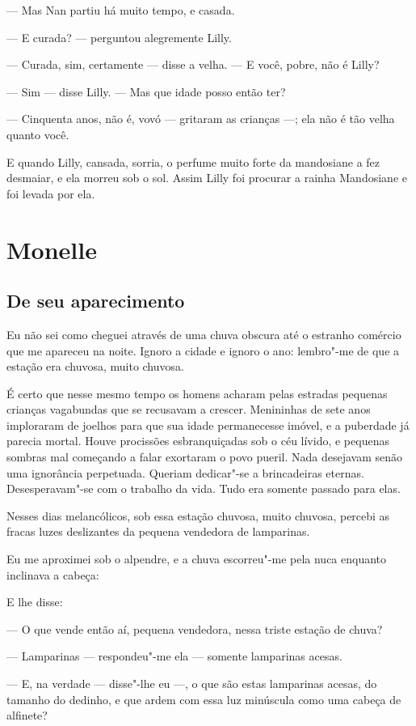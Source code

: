 --- Mas Nan partiu há muito tempo, e casada.

--- E curada? --- perguntou alegremente Lilly.

--- Curada, sim, certamente --- disse a velha. --- E você, pobre, não é Lilly?

--- Sim --- disse Lilly. --- Mas que idade posso então ter?

--- Cinquenta anos, não é, vovó --- gritaram as crianças ---; ela não é tão
velha quanto você.

E quando Lilly, cansada, sorria, o perfume muito forte da mandosiane a
fez desmaiar, e ela morreu sob o sol. Assim Lilly foi procurar a rainha
Mandosiane e foi levada por ela.

\chapter{Monelle}

\section*{De seu aparecimento}

Eu não sei como cheguei através de uma chuva obscura até o estranho
comércio que me apareceu na noite. Ignoro a cidade e ignoro o ano:
lembro"-me de que a estação era chuvosa, muito chuvosa.

É certo que nesse mesmo tempo os homens acharam pelas estradas pequenas
crianças vagabundas que se recusavam a crescer. Menininhas de sete anos
imploraram de joelhos para que sua idade permanecesse imóvel, e a
puberdade já parecia mortal. Houve procissões esbranquiçadas sob o céu
lívido, e pequenas sombras mal começando a falar exortaram o povo pueril.
Nada desejavam senão uma ignorância perpetuada. Queriam dedicar"-se a
brincadeiras eternas. Desesperavam"-se com o trabalho da vida. Tudo era
somente passado para elas.

Nesses dias melancólicos, sob essa estação chuvosa, muito chuvosa,
percebi as fracas luzes deslizantes da pequena vendedora de lamparinas.

Eu me aproximei sob o alpendre, e a chuva escorreu"-me pela nuca
enquanto inclinava a cabeça:

E lhe disse:

--- O que vende então aí, pequena vendedora, nessa triste estação de
chuva?

--- Lamparinas --- respondeu"-me ela --- somente lamparinas acesas.

--- E, na verdade --- disse"-lhe eu ---, o que são estas lamparinas acesas, do
tamanho do dedinho, e que ardem com essa luz minúscula como uma cabeça de
alfinete?

